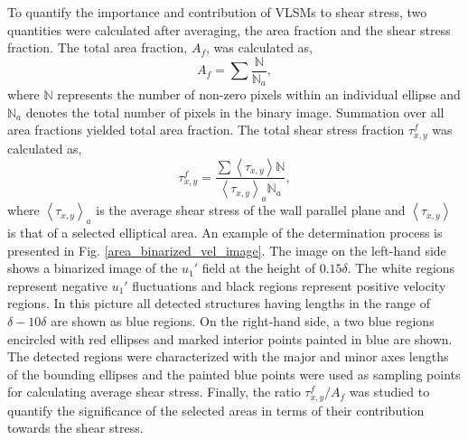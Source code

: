 To quantify the importance and contribution of VLSMs to shear stress, two quantities were calculated after averaging, the area fraction and the shear stress fraction. The total area fraction, $A_f$, was calculated as, 
\begin{equation*}
		A_f = \sum \frac{\mathbb{N}}{\mathbb{N}_a},
\label{eqn:area_frac_def}        
\end{equation*}
\noindent where $\mathbb{N}$ represents the number of non-zero pixels  within an individual ellipse and $\mathbb{N}_a$ denotes the total number of pixels in the binary image. Summation over all area fractions yielded total area fraction. The total shear stress fraction $\tau_{x,y}^f$ was  calculated as, 
\begin{equation*}
		\tau_{x,y}^f =\frac{\sum \left < \tau_{x,y} \right > \mathbb{N}}{\left < \tau_{x,y}\right >_a\mathbb{N}_a },
\label{eqn:stress_frac_def}             
\end{equation*}
\noindent where $\left < \tau_{x,y}\right >_a$  is the average shear stress of the wall parallel plane and $\left < \tau_{x,y} \right >$ is that of a selected elliptical area.  An example of the determination process is presented in Fig. \ref{area_binarized_vel_image}. The image on the left-hand side shows a binarized image of the $u_{1}'$ field at the height of $0.15\delta$.  The white regions represent negative $u_{1}'$ fluctuations and black regions represent positive velocity regions. In this picture all detected structures having  lengths in the range  of $\delta-10\delta$ are shown as blue regions. On the right-hand side, a two blue regions  encircled with red  ellipses and marked interior points painted in blue are shown.  The detected regions were characterized with the major and minor axes lengths of the bounding ellipses and the painted blue points were used as sampling points for calculating average shear stress. Finally, the ratio $\tau_{x,y}^f/A_f$ was studied to quantify the significance of the selected areas in terms of  their contribution towards the shear stress.  

